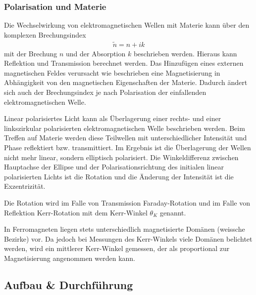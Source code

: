
  \subsubsection{Polarisation und Materie}
  Die Wechselwirkung von elektromagnetischen Wellen mit Materie kann über den komplexen Brechungsindex
	\begin{align*}
		\tilde{n} = n + ik
	\end{align*}
  mit der Brechung $n$ und der Absorption $k$ beschrieben werden.
  Hieraus kann Reflektion und Transmission berechnet werden.
  Das Hinzufügen eines externen magnetischen Feldes verursacht wie beschrieben eine Magnetisierung in Abhängigkeit von den magnetischen Eigenschaften der Materie.
  Dadurch ändert sich auch der Brechungsindex je nach Polarisation der einfallenden elektromagnetischen Welle.

  Linear polarisiertes Licht kann als Überlagerung einer rechts- und einer linkszirkular polarisierten elektromagnetischen Welle beschrieben werden.
  Beim Treffen auf Materie werden diese Teilwellen mit unterschiedlicher Intensität und Phase reflektiert bzw. transmittiert.
	Im Ergebnis ist die Überlagerung der Wellen nicht mehr linear, sondern elliptisch polarisiert.
	Die Winkeldifferenz zwischen Hauptachse der Ellipse und der Polarisationsrichtung des initialen linear polarisierten Lichts ist die Rotation und die Änderung der Intensität ist die Exzentrizität.

  Die Rotation wird im Falle von Transmission Faraday-Rotation und im Falle von Reflektion Kerr-Rotation mit dem Kerr-Winkel $\theta_K$ genannt.

  In Ferromagneten liegen stets unterschiedlich magnetisierte Domänen (weissche Bezirke) vor.
  Da jedoch bei Messungen des Kerr-Winkels viele Domänen belichtet werden, wird ein mittlerer Kerr-Winkel gemessen, der als proportional zur Magnetisierung angenommen werden kann.

\subsection{Aufbau \& Durchführung}

